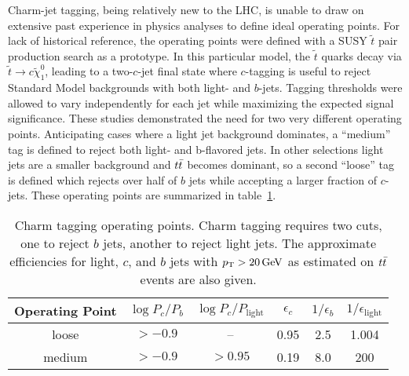 Charm-jet tagging, being relatively new to the LHC, is unable to draw on extensive past experience in physics analyses to define ideal operating points. For lack of historical reference, the operating points were defined with a SUSY $\tilde{t}$ pair production search as a prototype. In this particular model, the $\tilde{t}$ quarks decay via $\tilde{t} \to c \tilde{\chi}_1^0$, leading to a two-$c$-jet final state where $c$-tagging is useful to reject Standard Model backgrounds with both light- and $b$-jets. %
Tagging thresholds were allowed to vary independently for each jet while maximizing the expected signal significance. %
These studies demonstrated the need for two very different operating points. Anticipating cases where a light jet background dominates, a ``medium'' tag is defined to reject both light- and b-flavored{} jets. In other selections light jets are a smaller background and $t \bar{t}$ becomes dominant, so a second ``loose'' tag is defined which rejects over half of $b$ jets while accepting a larger fraction of $c$-jets. These operating points are summarized in table~\ref{tag:tab:ops}.

\begin{table}[htb]
\begin{center}
\begin{tabular}{c|c c | c c c }
Operating Point & $\log P_c / P_b$ & $\log P_c / P_{\text{light}}$ & $\epsilon_c$ & $1/\epsilon_b$ & $1/\epsilon_{\text{light}}$ \\ \hline
loose & $> -0.9$ & -- & 0.95 & 2.5 & 1.004 \\
medium & $> -0.9$ & $> 0.95$ & 0.19 & 8.0 & 200 \\ \hline
\end{tabular}
\caption[Charm tagging operating points]{Charm tagging operating points. Charm tagging requires two cuts, one to reject $b$ jets, another to reject light jets. The approximate efficiencies for light, $c$, and $b$ jets with $p_{\rm T} > 20\,\text{GeV}$ as estimated on $t \bar{t}$ events are also given.}
\label{tag:tab:ops}
\end{center}
\end{table}


